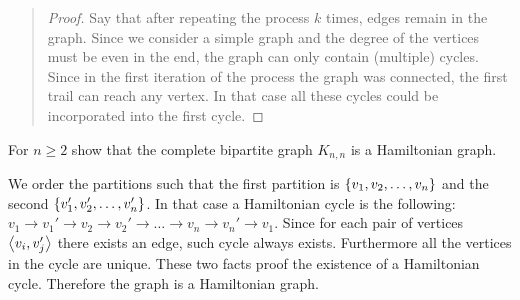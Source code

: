 \documentclass{article}
\begin{document}
\begin{exercise}
\begin{note}
\begin{answer}
\begin{quote}\begin{proof}
Say that after repeating the process $k$ times, edges remain in the graph. Since we consider a simple graph and the degree of the vertices must be even in the end, the graph can only contain (multiple) cycles. Since in the first iteration of the process the graph was connected, the first trail can reach any vertex. In that case all these cycles could be incorporated into the first cycle.
\end{proof}\end{quote}
\end{answer}
\end{note}
\end{exercise}

\begin{exercise}
For $n\geq2$ show that the complete bipartite graph $K_{n,n}$ is a Hamiltonian graph.
\begin{answer}
We order the partitions such that the first partition is $\left\{ v_1,v_2,\ldots,v_n \right\}$ and the second $\left\{ v_1',v_2',\ldots,v_n' \right\}$. In that case a Hamiltonian cycle is the following: $v_1\rightarrow v_1'\rightarrow v_2\rightarrow v_2'\rightarrow\ldots\rightarrow v_n\rightarrow v_n'\rightarrow v_1$. Since for each pair of vertices $\left\langle v_i,v_j' \right\rangle$ there exists an edge, such cycle always exists. Furthermore all the vertices in the cycle are unique. These two facts proof the existence of a Hamiltonian cycle. Therefore the graph is a Hamiltonian graph.
\end{answer}
\end{exercise}
\end{document}
